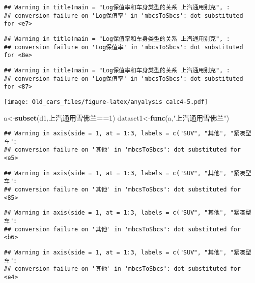 \documentclass[]{article}
\newenvironment{Shaded}{\begin{snugshade}}{\end{snugshade}}
\newcommand{\KeywordTok}[1]{\textcolor[rgb]{0.13,0.29,0.53}{\textbf{#1}}}
\newcommand{\DecValTok}[1]{\textcolor[rgb]{0.00,0.00,0.81}{#1}}
\newcommand{\StringTok}[1]{\textcolor[rgb]{0.31,0.60,0.02}{#1}}
\newcommand{\OperatorTok}[1]{\textcolor[rgb]{0.81,0.36,0.00}{\textbf{#1}}}
\newcommand{\NormalTok}[1]{#1}
\begin{document}
\begin{verbatim}
## Warning in title(main = "Log保值率和车身类型的关系 上汽通用别克", :
## conversion failure on 'Log保值率' in 'mbcsToSbcs': dot substituted for <e7>
\end{verbatim}

\begin{verbatim}
## Warning in title(main = "Log保值率和车身类型的关系 上汽通用别克", :
## conversion failure on 'Log保值率' in 'mbcsToSbcs': dot substituted for <8e>
\end{verbatim}

\begin{verbatim}
## Warning in title(main = "Log保值率和车身类型的关系 上汽通用别克", :
## conversion failure on 'Log保值率' in 'mbcsToSbcs': dot substituted for <87>
\end{verbatim}

\texttt{[image: Old\_cars\_files/figure-latex/anyalysis calc4-5.pdf]}

\begin{Shaded}
\begin{Highlighting}[]
\NormalTok{a<-}\KeywordTok{subset}\NormalTok{(d1,上汽通用雪佛兰}\OperatorTok{==}\DecValTok{1}\NormalTok{)}
\NormalTok{dataset1<-}\KeywordTok{func}\NormalTok{(a,}\StringTok{"上汽通用雪佛兰"}\NormalTok{)}
\end{Highlighting}
\end{Shaded}

\begin{verbatim}
## Warning in axis(side = 1, at = 1:3, labels = c("SUV", "其他", "紧凑型车":
## conversion failure on '其他' in 'mbcsToSbcs': dot substituted for <e5>
\end{verbatim}

\begin{verbatim}
## Warning in axis(side = 1, at = 1:3, labels = c("SUV", "其他", "紧凑型车":
## conversion failure on '其他' in 'mbcsToSbcs': dot substituted for <85>
\end{verbatim}

\begin{verbatim}
## Warning in axis(side = 1, at = 1:3, labels = c("SUV", "其他", "紧凑型车":
## conversion failure on '其他' in 'mbcsToSbcs': dot substituted for <b6>
\end{verbatim}

\begin{verbatim}
## Warning in axis(side = 1, at = 1:3, labels = c("SUV", "其他", "紧凑型车":
## conversion failure on '其他' in 'mbcsToSbcs': dot substituted for <e4>
\end{verbatim}
\end{document}
